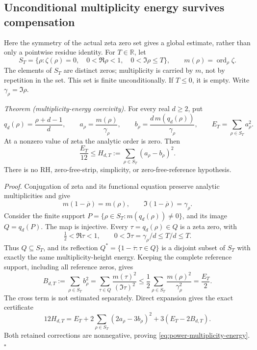 \subsection{Unconditional multiplicity energy survives compensation}
\label{sec:power-multiplicity-energy}

Here the symmetry of the actual zeta zero set gives a global estimate,
rather than only a pointwise residue identity. For \(T\in\mathbb R\), let
\[
 S_T=\{\rho:\zeta(\rho)=0,\quad 0<\Re\rho<1,\quad
                         0<\Im\rho\le T\},
 \qquad m(\rho)=\operatorname{ord}_{\rho}\zeta.
\]
The elements of \(S_T\) are distinct zeros; multiplicity is carried by
\(m\), not by repetition in the set. This set is finite unconditionally.
If \(T\le0\), it is empty. Write \(\gamma_\rho=\Im\rho\).

\emph{Theorem (multiplicity-energy coercivity).}
For every real \(d\ge2\), put
\[
 q_d(\rho)=\frac{\rho+d-1}{d},\qquad
 a_\rho=\frac{m(\rho)}{\gamma_\rho},\qquad
 b_\rho=\frac{d\,m(q_d(\rho))}{\gamma_\rho},
 \qquad E_T=\sum_{\rho\in S_T}a_\rho^2.
\]
At a nonzero value of zeta the analytic order is zero. Then
\begin{equation}\label{eq:power-multiplicity-energy}
 \frac{E_T}{12}\le
 H_{d,T}:=\sum_{\rho\in S_T}(a_\rho-b_\rho)^2 .
\end{equation}
There is no RH, zero-free-strip, simplicity, or zero-free-reference
hypothesis.

\emph{Proof.}
Conjugation of zeta and its functional equation preserve analytic
multiplicities and give
\[
 m(1-\overline\rho)=m(\rho),\qquad
 \Im(1-\overline\rho)=\gamma_\rho.
\]
Consider the finite support
\(P=\{\rho\in S_T:m(q_d(\rho))\ne0\}\), and its image
\(Q=q_d(P)\). The map is injective. Every \(\tau=q_d(\rho)\in Q\)
is a zeta zero, with
\[
 \tfrac12<\Re\tau<1,\qquad
 0<\Im\tau=\gamma_\rho/d\le T/d\le T.
\]
Thus \(Q\subseteq S_T\), and its reflection
\(Q^*=\{1-\overline\tau:\tau\in Q\}\) is a disjoint subset of
\(S_T\) with exactly the same multiplicity-height energy. Keeping the
complete reference support, including all reference zeros, gives
\[
 B_{d,T}:=\sum_{\rho\in S_T}b_\rho^2
 =\sum_{\tau\in Q}\frac{m(\tau)^2}{(\Im\tau)^2}
 \le\frac12\sum_{\rho\in S_T}\frac{m(\rho)^2}{\gamma_\rho^2}
 =\frac{E_T}{2}.
\]
The cross term is not estimated separately. Direct expansion gives
the exact certificate
\begin{equation}\label{eq:power-energy-certificate}
 12H_{d,T}
 =E_T+2\sum_{\rho\in S_T}(2a_\rho-3b_\rho)^2
       +3(E_T-2B_{d,T}).
\end{equation}
Both retained corrections are nonnegative, proving
\eqref{eq:power-multiplicity-energy}. \(\square\)

